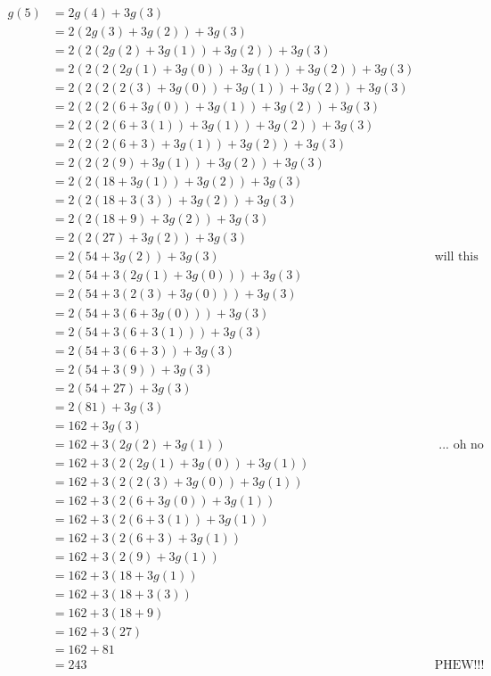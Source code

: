 \begin{align*}
g(5)
&= 2g(4) + 3g(3) \\
&= 2(2g(3) + 3g(2)) + 3g(3) \\
&= 2(2(2g(2) + 3g(1)) + 3g(2)) + 3g(3) \\
&= 2(2(2(2g(1) + 3g(0)) + 3g(1)) + 3g(2)) + 3g(3) \\
&= 2(2(2(2(3) + 3g(0)) + 3g(1)) + 3g(2)) + 3g(3) \\
&= 2(2(2(6 + 3g(0)) + 3g(1)) + 3g(2)) + 3g(3) \\
&= 2(2(2(6 + 3(1)) + 3g(1)) + 3g(2)) + 3g(3) \\
&= 2(2(2(6 + 3) + 3g(1)) + 3g(2)) + 3g(3) \\
&= 2(2(2(9) + 3g(1)) + 3g(2)) + 3g(3) \\
&= 2(2(18 + 3g(1)) + 3g(2)) + 3g(3) \\
&= 2(2(18 + 3(3)) + 3g(2)) + 3g(3) \\
&= 2(2(18 + 9) + 3g(2)) + 3g(3) \\
&= 2(2(27) + 3g(2)) + 3g(3) \\
&= 2(54 + 3g(2)) + 3g(3) & & \text{will this ever end?!?} \\
&= 2(54 + 3(2g(1) + 3g(0))) + 3g(3) \\
&= 2(54 + 3(2(3) + 3g(0))) + 3g(3) \\
&= 2(54 + 3(6 + 3g(0))) + 3g(3) \\
&= 2(54 + 3(6 + 3(1))) + 3g(3) \\
&= 2(54 + 3(6 + 3)) + 3g(3) \\
&= 2(54 + 3(9)) + 3g(3) \\
&= 2(54 + 27) + 3g(3) \\
&= 2(81) + 3g(3) \\
&= 162 + 3g(3) \\
&= 162 + 3(2g(2) + 3g(1)) & & \text{ ... oh no ... here we go again ...}\\
&= 162 + 3(2(2g(1) + 3g(0)) + 3g(1)) \\
&= 162 + 3(2(2(3) + 3g(0)) + 3g(1)) \\
&= 162 + 3(2(6 + 3g(0)) + 3g(1)) \\
&= 162 + 3(2(6 + 3(1)) + 3g(1)) \\
&= 162 + 3(2(6 + 3) + 3g(1)) \\
&= 162 + 3(2(9) + 3g(1)) \\
&= 162 + 3(18 + 3g(1)) \\
&= 162 + 3(18 + 3(3)) \\
&= 162 + 3(18 + 9) \\
&= 162 + 3(27) \\
&= 162 + 81 \\
&= 243 & & \text{PHEW!!!}
\end{align*}

